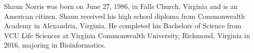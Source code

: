 \documentclass[
12pt, %
english, %
singlespacing, %
headsepline, %
]{MastersDoctoralThesis} %
\begin{document}




\mainmatter %

\pagestyle{thesis} %



 

 
 



\printbibliography[heading=bibintoc]



\appendix %


%
%

\begin{vita}
Shaun Norris was born on June 27, 1986, in Falls Church, Virginia and is an American citizen. Shaun received his high school diploma from Commonwealth Academy in Alexandria, Virginia. He completed his Bachelors of Science from VCU Life Sciences at Virginia Commonwealth University, Richmond, Virginia in
2016, majoring in Bioinformatics.
\end{vita}
\end{document}
